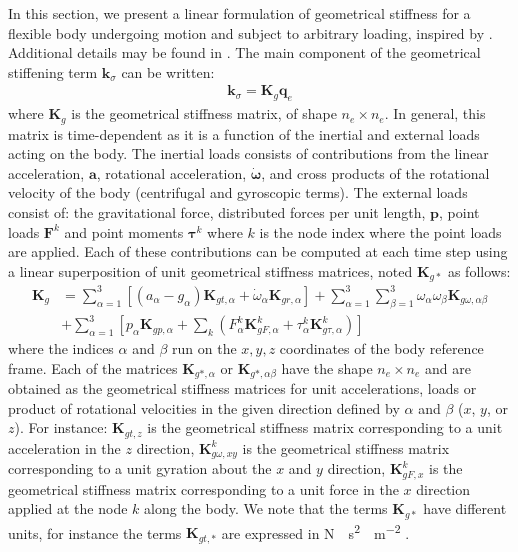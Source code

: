 \documentclass[wes, manuscript]{copernicus}
\renewcommand{\v}[1]{\boldsymbol{#1}}
\newcommand{\m}[1]{\boldsymbol{#1}}
\begin{document}
In this section, we present a linear formulation of geometrical stiffness for a flexible body undergoing motion and subject to arbitrary loading, inspired by \cite{Schwertassek:book}. 
Additional details may be found in \cite{Wallrapp:1991}.
The main component of the geometrical stiffening term $\v{k}_\sigma$ can be written:
\begin{align}
  \v{k}_\sigma = \m{K}_g  \v{q}_e
\end{align}
where $\m{K}_g$ is the geometrical stiffness matrix, of shape $n_e\times n_e$.
In general, this matrix is time-dependent as it is a function of the inertial and external loads acting on the body.
The inertial loads consists of contributions from the linear acceleration, $\v{a}$, rotational acceleration, $\v{\dot{\omega}}$, and cross products of the rotational velocity of the body (centrifugal and gyroscopic terms).
% 
The external loads consist of: the gravitational force, distributed forces per unit length, $\v{p}$, point loads $\v{F}^k$ and point moments $\v{\tau}^k$ where $k$ is the node index where the point loads are applied. Each of these contributions can be computed at each time step using a linear superposition of unit geometrical stiffness matrices, noted $\m{K}_{g*}$ as follows:
\begin{align}
    \m{K}_g &= 
    \sum\limits_{\alpha=1}^3 \left[ 
      \left(a_\alpha - g_\alpha \right) \m{K}_{gt,\alpha}
     + \dot{\omega}_\alpha \m{K}_{gr,\alpha}
     \right]
     + \sum\limits_{\alpha=1}^3\sum\limits_{\beta=1}^3  \omega_\alpha\omega_\beta \m{K}_{g\omega,\alpha\beta} 
      \nonumber\\
      &
      + \sum\limits_{\alpha=1}^3   \left[
       p_\alpha \m{K}_{gp,\alpha}
      + \sum\limits_{k} 
         \left (  F_\alpha^k \m{K}_{gF,\alpha}^k +\tau_\alpha^k \m{K}_{g\tau,\alpha}^k\right)
       \right]
       \label{eq:GeomStiff}
\end{align}
where the indices $\alpha$ and $\beta$ run on the $x, y, z$ coordinates of the body reference frame. 
Each of the matrices $\m{K}_{g*,\alpha}$ or $\m{K}_{g*,\alpha\beta}$ have the shape $n_e\times n_e$ and are obtained as the geometrical stiffness matrices for unit accelerations, loads or product of rotational velocities in the given direction defined by $\alpha$ and $\beta$ ($x$, $y$, or $z$).
For instance: $\m{K}_{gt,z}$ is the geometrical stiffness matrix corresponding to a unit acceleration in the $z$ direction, 
$\m{K}_{g\omega,xy}^k$ is the geometrical stiffness matrix corresponding to a unit gyration about the $x$ and $y$ direction,
    $\m{K}_{gF,x}^k$ is the geometrical stiffness matrix corresponding to a unit force in the $x$ direction applied at the node $k$ along the body. 
% 
We note that the terms $\m{K}_{g*}$ have different units, for instance the terms $\m{K}_{gt,*}$ are expressed in \unit{N\cdot s^2 \cdot m^{-2}} .
\end{document}
